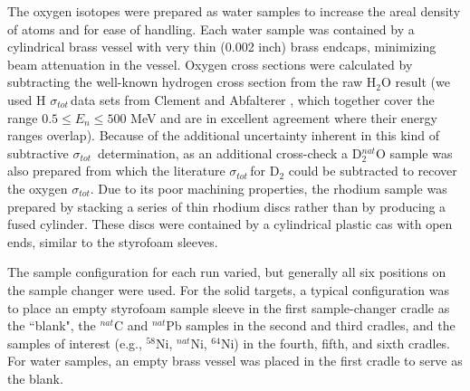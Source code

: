 \documentclass[twocolumn,secnumarabic,amssymb, nobibnotes, aps, prl,
superscriptaddress, nobalancelastpage]{revtex4}
\newcommand{\tot}{\ensuremath{\sigma_{tot}}}
\newcommand{\tots}{\ensuremath{\sigma_{tot}}\,}
\begin{document}
The oxygen isotopes were prepared as water samples to increase the areal density
of atoms and for ease of handling. Each water sample was contained by a
cylindrical brass vessel with very thin (0.002 inch) brass endcaps, minimizing
beam attenuation in the vessel. Oxygen cross sections were calculated by
subtracting the well-known hydrogen cross section from the raw H$_{2}$O result
(we used H \tots data sets from Clement \cite{Clement1972} and Abfalterer 
\cite{Abfalterer2001}, which together cover the range $0.5 \leq E_n \leq 500$ MeV
and are in excellent agreement where their energy ranges overlap). Because of
the additional uncertainty inherent in this kind of subtractive \tots
determination, as an additional cross-check a D$_{2}^{nat}$O sample was also
prepared from which the literature \tots for D$_{2}$ could be subtracted to
recover the oxygen \tot. Due to its poor machining properties, the rhodium
sample was prepared by stacking a series of thin rhodium discs rather than by
producing a fused cylinder. These discs were contained by a cylindrical plastic
cas with open ends, similar to the styrofoam sleeves.

The sample configuration for each run varied, but generally all six positions on
the sample changer were used. For the solid targets, a typical configuration was
to place an empty styrofoam sample sleeve in the first sample-changer cradle as
the ``blank", the $^{nat}$C and $^{nat}$Pb samples in the second and third
cradles, and the samples of interest (e.g., $^{58}$Ni, $^{nat}$Ni, $^{64}$Ni) in
the fourth, fifth, and sixth cradles. For water samples, an empty brass vessel
was placed in the first cradle to serve as the blank.
\end{document}
